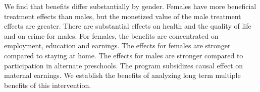 We find that benefits differ substantially by gender. Females have more beneficial treatment effects than males, but the monetized value of the male treatment effects are greater. There are substantial effects on health and the quality of life and on crime for males. For females, the benefits are concentrated on employment, education and earnings. The effects for females are stronger compared to staying at home. The effects for males are stronger compared to participation in alternate preschools. The program subsidizes causal effect on maternal earnings. We establish the benefits of analyzing long term multiple benefits of this intervention.

\singlespace



 